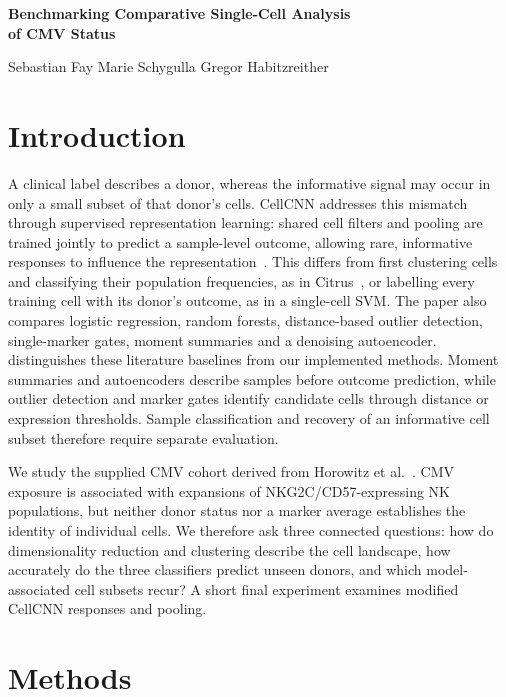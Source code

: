 \documentclass[11pt,a4paper]{article}
\begin{document}
\begin{center}
{\Large\bfseries Benchmarking Comparative Single-Cell Analysis\\of CMV Status\par}
\vspace{3pt}
Sebastian Fay \quad Marie Schygulla \quad Gregor Habitzreither
\end{center}
\vspace{-6pt}

\section{Introduction}
A clinical label describes a donor, whereas the informative signal may occur in only a small subset of that donor's cells. CellCNN addresses this mismatch through supervised representation learning: shared cell filters and pooling are trained jointly to predict a sample-level outcome, allowing rare, informative responses to influence the representation~\cite{cellcnn}. This differs from first clustering cells and classifying their population frequencies, as in Citrus~\cite{citrus}, or labelling every training cell with its donor's outcome, as in a single-cell SVM. The paper also compares logistic regression, random forests, distance-based outlier detection, single-marker gates, moment summaries and a denoising autoencoder.  distinguishes these literature baselines from our implemented methods. Moment summaries and autoencoders describe samples before outcome prediction, while outlier detection and marker gates identify candidate cells through distance or expression thresholds. Sample classification and recovery of an informative cell subset therefore require separate evaluation.

We study the supplied CMV cohort derived from Horowitz et al.~\cite{horowitz}. CMV exposure is associated with expansions of NKG2C/CD57-expressing NK populations, but neither donor status nor a marker average establishes the identity of individual cells. We therefore ask three connected questions: how do dimensionality reduction and clustering describe the cell landscape, how accurately do the three classifiers predict unseen donors, and which model-associated cell subsets recur? A short final experiment examines modified CellCNN responses and pooling.

\section{Methods}
\end{document}
